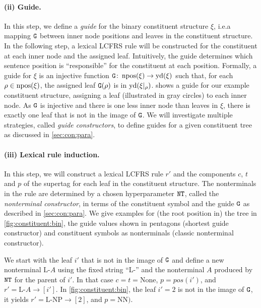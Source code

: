 \documentclass[../../document.tex]{subfiles}
\begin{document}
    \paragraph{(ii) Guide.}
    In this step, we define a \emph{guide} for the binary constituent structure \(\xi\), i.e.\@ a mapping \(\texttt{G}\) between inner node positions and leaves in the constituent structure.
    In the following step, a lexical LCFRS rule will be constructed for the constituent at each inner node and the assigned leaf.
    Intuitively, the guide determines which sentence position is ``responsible'' for the constituent at each position.
    Formally, a guide for \(\xi\) is an injective function \(\texttt{G}\colon \operatorname{npos}(\xi) \to \operatorname{yd}(\xi)\) such that, for each \(\rho \in \operatorname{npos}(\xi)\), the assigned leaf \(\texttt{G}(\rho)\) is in \(\operatorname{yd}(\xi|_\rho)\).
     shows a guide for our example constituent structure, assigning a leaf (illustrated in gray circles) to each inner node.
    As \(\texttt{G}\) is injective and there is one less inner node than leaves in \(\xi\), there is exactly one leaf that is not in the image of \(\texttt{G}\).
    We will investigate multiple strategies, called \emph{guide constructors}, to define guides for a given constituent tree as discussed in \cref{sec:con:para}.

    \paragraph{(iii) Lexical rule induction.}
    In this step, we will construct a lexical LCFRS rule \(r'\) and the components \(c\), \(t\) and \(p\) of the supertag for each leaf in the constituent structure.
    The nonterminals in the rule are determined by a chosen hyperparameter \(\texttt{NT}\), called the \emph{nonterminal constructor}, in terms of the constituent symbol and the guide \(\texttt{G}\) as described in \cref{sec:con:para}.
    We give examples for (the root position in) the tree in \cref{fig:constituent:bin}, the guide values shown in pentagons (shortest guide constructor) and constituent symbols as nonterminals (classic nonterminal constructor).

    We start with the leaf \(i'\) that is not in the image of \(\texttt{G}\) and define a new nonterminal \(\text{L-}A\) using the fixed string ``L-'' and the nonterminal \(A\) produced by \(\texttt{NT}\) for the parent of \(i'\).
    In that case \(c = t = \text{None}\), \(p = \mathit{pos}(i')\), and \(r' = \text{L-}A \to [i']\).
    In \cref{fig:constituent:bin}, the leaf \(i'=2\) is not in the image of \(\texttt{G}\), it yields \(r' = \text{L-NP} \to [2]\), and \(p = \text{NN})\).
\end{document}
